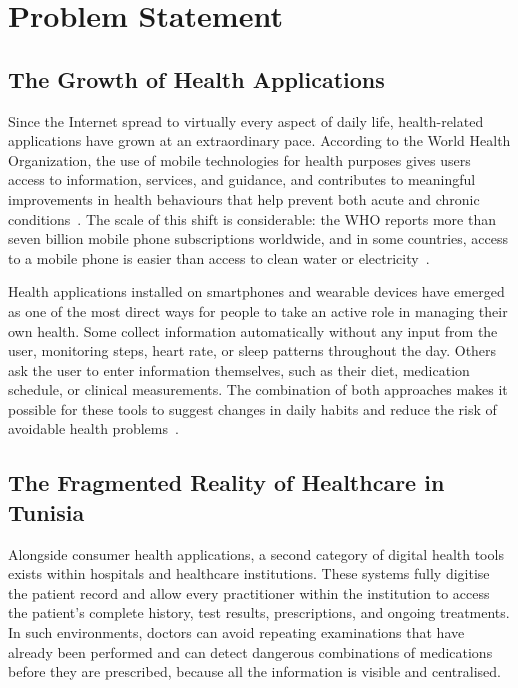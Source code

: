 \section{Problem Statement}

\subsection*{The Growth of Health Applications}

Since the Internet spread to virtually every aspect of daily life, health-related applications
have grown at an extraordinary pace. According to the World Health Organization, the use
of mobile technologies for health purposes gives users access to information, services, and
guidance, and contributes to meaningful improvements in health behaviours that help
prevent both acute and chronic conditions~\cite{who2016}. The scale of this shift is
considerable: the WHO reports more than seven billion mobile phone subscriptions
worldwide, and in some countries, access to a mobile phone is easier than access to clean
water or electricity~\cite{who2018}.

Health applications installed on smartphones and wearable devices have emerged as one of
the most direct ways for people to take an active role in managing their own health. Some
collect information automatically without any input from the user, monitoring steps, heart
rate, or sleep patterns throughout the day. Others ask the user to enter information
themselves, such as their diet, medication schedule, or clinical measurements. The
combination of both approaches makes it possible for these tools to suggest changes in
daily habits and reduce the risk of avoidable health problems~\cite{milne2020}.

\subsection*{The Fragmented Reality of Healthcare in Tunisia}

Alongside consumer health applications, a second category of digital health tools exists
within hospitals and healthcare institutions. These systems fully digitise the patient record
and allow every practitioner within the institution to access the patient's complete history,
test results, prescriptions, and ongoing treatments. In such environments, doctors can avoid
repeating examinations that have already been performed and can detect dangerous
combinations of medications before they are prescribed, because all the information is
visible and centralised.

